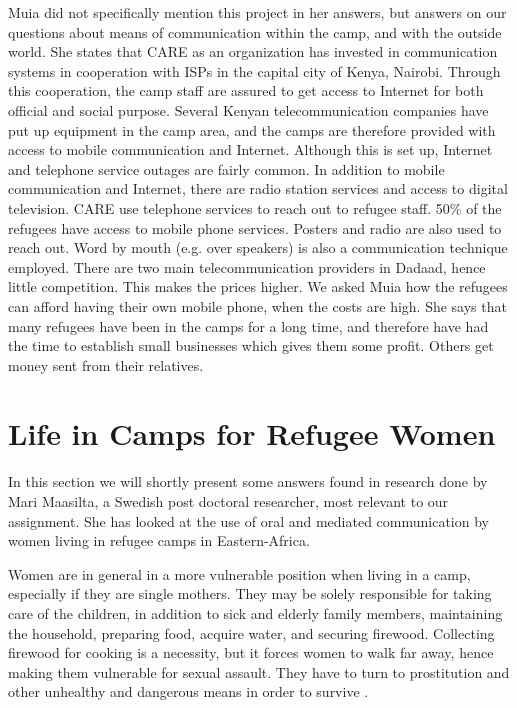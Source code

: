 Muia did not specifically mention this project in her answers, but answers on our questions about means of communication within the camp, and with the outside world. She states that CARE as an organization has invested in communication systems in cooperation with ISPs in the capital city of Kenya, Nairobi. Through this cooperation, the camp staff are assured to get access to Internet for both official and social purpose. Several Kenyan telecommunication companies have put up equipment in the camp area, and the camps are therefore provided with access to mobile communication and Internet. Although this is set up, Internet and telephone service outages are fairly common. In addition to mobile communication and Internet, there are radio station services and access to digital television. CARE use telephone services to reach out to refugee staff. 50\% of the refugees have access to mobile phone services. Posters and radio are also used to reach out. Word by mouth (e.g. over speakers) is also a communication technique employed. There are two main telecommunication providers in Dadaad, hence little competition. This makes the prices higher. We asked Muia how the refugees can afford having their own mobile phone, when the costs are high. She says that many refugees have been in the camps for a long time, and therefore have had the time to establish small businesses which gives them some profit. Others get money sent from their relatives. 


\section{Life in Camps for Refugee Women}
In this section we will shortly present some answers found in research done by Mari Maasilta, a Swedish post doctoral researcher, most relevant to our assignment. She has looked at the use of oral and mediated communication by women living in refugee camps in Eastern-Africa. 

Women are in general in a more vulnerable position when living in a  camp, especially if they are single mothers. They may be solely responsible for taking care of the children, in addition to sick and elderly family members, maintaining the household, preparing food, acquire water, and securing firewood. Collecting firewood for cooking is a necessity, but it forces women  to walk far away, hence making them vulnerable for sexual assault. They have to turn to prostitution and other unhealthy and dangerous means in order to survive \cite{womenRefugee}. 

